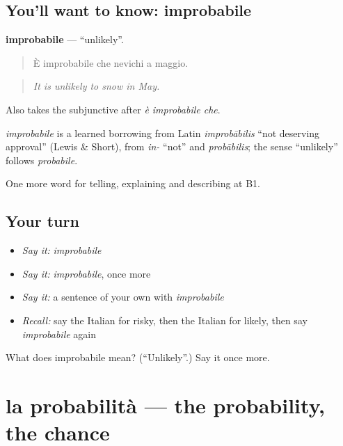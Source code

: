 \subsection*{You'll want to know: improbabile}
\textbf{improbabile} — \textquotedblleft{}unlikely\textquotedblright{}.

\begin{quote}
È improbabile che nevichi a maggio.
\end{quote}

\begin{quote}
\emph{It is unlikely to snow in May.}
\end{quote}

Also takes the subjunctive after \emph{è improbabile che}.

\begin{cousinweb}
\emph{improbabile} is a learned borrowing from Latin \emph{improbābilis} \textquotedblleft{}not deserving approval\textquotedblright{} (Lewis \& Short), from \emph{in-} \textquotedblleft{}not\textquotedblright{} and \emph{probābilis}; the sense \textquotedblleft{}unlikely\textquotedblright{} follows \emph{probabile}.
\end{cousinweb}

\begin{grammarlens}[title={What you've built}]
One more word for telling, explaining and describing at B1.
\end{grammarlens}

\subsection*{Your turn}
\begin{itemize}
\raggedright
  \item \emph{Say it:} \emph{improbabile}
  \item \emph{Say it:} \emph{improbabile}, once more
  \item \emph{Say it:} a sentence of your own with \emph{improbabile}
  \item \emph{Recall:} say the Italian for risky, then the Italian for likely, then say \emph{improbabile} again
\end{itemize}

\begin{tcolorbox}[breakable,colback=teal!4,colframe=teal!35!black,title={Before you move on}]
What does improbabile mean? (\textquotedblleft{}Unlikely\textquotedblright{}.) Say it once more.
\end{tcolorbox}
\section[la probabilità]{la probabilità — the probability, the chance}

